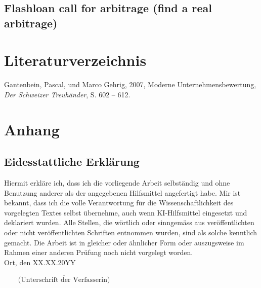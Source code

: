 \documentclass[11pt,a4paper,titlepage]{scrartcl}
\begin{document}
\subsection{Flashloan call for arbitrage (find a real arbitrage)}

\newpage



\section{Literaturverzeichnis}
Gantenbein, Pascal, und Marco Gehrig, 2007, Moderne Unternehmensbewertung, \textit{Der
Schweizer Treuhänder}, S. 602 – 612.


\newpage
\section{Anhang}
\subsection*{Eidesstattliche Erklärung}
Hiermit erkläre ich, dass ich die vorliegende Arbeit selbständig und ohne Benutzung anderer als der angegebenen Hilfsmittel angefertigt habe. Mir ist bekannt, dass ich die volle Verantwortung für die Wissenschaftlichkeit des vorgelegten Textes selbst übernehme, auch wenn KI-Hilfsmittel eingesetzt und deklariert wurden. Alle Stellen, die wörtlich oder sinngemäss aus veröffentlichten oder nicht veröffentlichten Schriften entnommen wurden, sind als solche kenntlich gemacht. Die Arbeit ist in gleicher oder ähnlicher Form oder auszugsweise im Rahmen einer anderen Prüfung noch nicht vorgelegt worden.\\
\noindent Ort, den XX.XX.20YY
\begin{flushright}
$\overline{~~~~~~~~~\mbox{(Unterschrift der Verfasserin)}~~~~~~~~~}$
\end{flushright}
\end{document}
